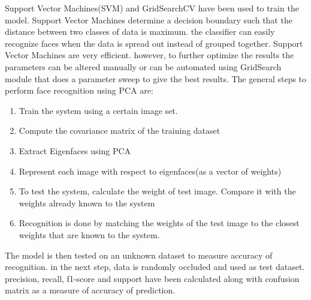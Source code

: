 \documentclass[conference]{IEEEtran}
\begin{document}
Support Vector Machines(SVM) and GridSearchCV have been used to train the model. Support Vector Machines determine a decision boundary such that the distance between two classes of data is maximum. the classifier can easily recognize faces when the data is spread out instead of grouped together. Support Vector Machines are very efficient. however, to further optimize the results the parameters can be altered manually or can be automated using GridSearch module that does a parameter sweep to give the best results.
The general steps to perform face recognition using PCA are:
\begin{enumerate}
\item Train the system using a certain image set.
\item Compute the covariance matrix of the training dataset
\item Extract Eigenfaces using PCA
\item Represent each image with respect to eigenfaces(as a vector of weights)
\item To test the system, calculate the weight of test image. Compare it with the weights already known to the system
\item Recognition is done by matching the weights of the test image to the closest weights that are known to the system. 
\end{enumerate}
	
The model is then tested on an unknown dataset to measure accuracy of recognition. in the next step, data is randomly occluded and used as test dataset. precision, recall, f1-score and support have been calculated along with confusion matrix as a measure of accuracy of prediction. 
\end{document}
